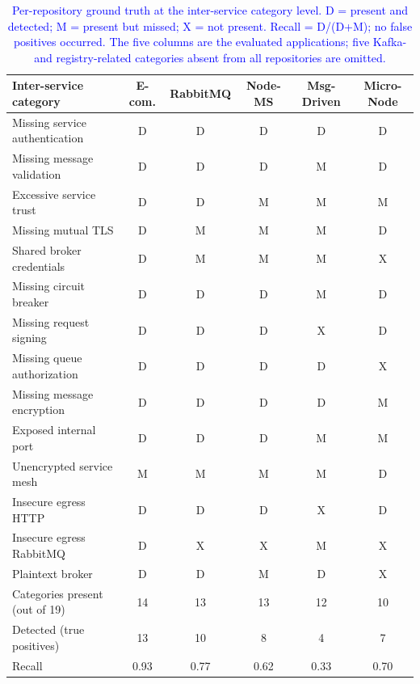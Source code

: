 \documentclass[preprint,12pt]{elsarticle}
\newcommand{\new}[1]{\textcolor{blue}{#1}}
\newcommand{\safefixtablestyle}{%
  \small
  \setlength{\tabcolsep}{5pt}
  \renewcommand{\arraystretch}{1.15}
}
\begin{document}
\begin{table}[!t]
\centering
\caption{\new{Per-repository ground truth at the inter-service category level. D = present and detected; M = present but missed; X = not present. Recall = D/(D+M); no false positives occurred. The five columns are the evaluated applications; five Kafka- and registry-related categories absent from all repositories are omitted.}}
\label{tab:presence_matrix}
\safefixtablestyle
\scriptsize
\setlength{\tabcolsep}{6pt}
\begin{tabular}{@{} l c c c c c @{}}
\toprule
Inter-service category & E-com. & RabbitMQ & Node-MS & Msg-Driven & Micro-Node \\
\midrule
Missing service authentication & D & D & D & D & D \\
Missing message validation & D & D & D & M & D \\
Excessive service trust & D & D & M & M & M \\
Missing mutual TLS & D & M & M & M & D \\
Shared broker credentials & D & M & M & M & X \\
Missing circuit breaker & D & D & D & M & D \\
Missing request signing & D & D & D & X & D \\
Missing queue authorization & D & D & D & D & X \\
Missing message encryption & D & D & D & D & M \\
Exposed internal port & D & D & D & M & M \\
Unencrypted service mesh & M & M & M & M & D \\
Insecure egress HTTP & D & D & D & X & D \\
Insecure egress RabbitMQ & D & X & X & M & X \\
Plaintext broker & D & D & M & D & X \\
\midrule
Categories present (out of 19) & 14 & 13 & 13 & 12 & 10 \\
Detected (true positives) & 13 & 10 & 8 & 4 & 7 \\
Recall & 0.93 & 0.77 & 0.62 & 0.33 & 0.70 \\
\bottomrule
\end{tabular}
\end{table}
\end{document}

